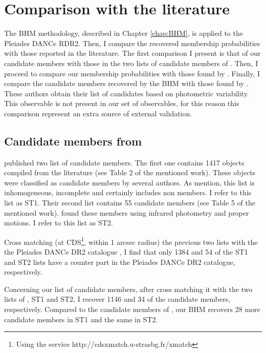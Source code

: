  
\section{Comparison with the literature}
\label{sect:memberscomparison}

The BHM methodology, described in Chapter \ref{chap:BHM}, is applied to the Pleiades DANCe RDR2. Then, I compare the recovered membership probabilities with those reported in the literature. The first comparison I present is that of our candidate members with those in the two lists of candidate members of \citet{Stauffer2007}. Then, I proceed to compare our membership probabilities with those found by \citet{Bouy2015}. Finally, I compare the candidate members recovered by the BHM with those found by \citet{Rebull2016}. These authors obtain their list of candidates based on photometric variability. This observable is not present in our set of observables, for this reason this comparison represent an extra source of external validation.  


\subsection{Candidate members from \citet{Stauffer2007}}

\citet{Stauffer2007} published two list of candidate members. The first one contains 1417 objects compiled from the literature (see Table 2 of the mentioned work). These objects were classified as candidate members by several authors. As \citet{Stauffer2007} mention, this list is inhomogeneous, incomplete and certainly includes non members. I refer to this list as ST1. Their second list contains 55 candidate members (see Table 5 of the mentioned work). \citet{Stauffer2007} found these members using infrared photometry and proper motions. I refer to this list as ST2.

Cross matching (at CDS\footnote{ Using the service http://cdsxmatch.u-strasbg.fr/xmatch}, within 1 arcsec radius) the previous two lists with the the Pleiades DANCe DR2 catalogue \citep{Bouy2015}, I find that only 1384 and 54 of the ST1 and ST2 lists have a counter part in the Pleiades DANCe DR2 catalogue, respectively. 

Concerning our list of candidate members, after cross matching it with the two lists of \citet{Stauffer2007}, ST1 and ST2, I recover 1146 and 34 of the candidate members, respectively. Compared to the candidate members of \citet{Bouy2015}, our BHM recovers 28 more candidate members in ST1 and the same in ST2.

